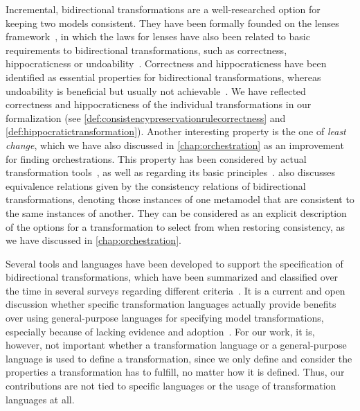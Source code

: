 Incremental, bidirectional transformations are a well-researched option for keeping two models consistent.
They have been formally founded on the lenses framework~\cite{stevens2008bxalgebraic-ICGT}, in which the laws for lenses have also been related to basic requirements to bidirectional transformations, such as correctness, hippocraticness or undoability~\cite{stevens2010sosym}.
Correctness and hippocraticness have been identified as essential properties for bidirectional transformations, whereas undoability is beneficial but usually not achievable~\cite{stevens2010sosym}.
We have reflected correctness and hippocraticness of the individual transformations in our formalization (see \autoref{def:consistencypreservationrulecorrectness} and \autoref{def:hippocratictransformation}).
Another interesting property is the one of \emph{least change}, which we have also discussed in \autoref{chap:orchestration} as an improvement for finding orchestrations.
This property has been considered by actual transformation tools~\cite{macedo2016qvtAtlAlloy-SoSym}, as well as regarding its basic principles~\cite{cheney2017LeastChangeBx-JOT}.
\textcite{stevens2012equivalences-EASST} also discusses equivalence relations given by the consistency relations of bidirectional transformations, denoting those instances of one metamodel that are consistent to the same instances of another.
They can be considered as an explicit description of the options for a transformation to select from when restoring consistency, as we have discussed in \autoref{chap:orchestration}.

Several tools and languages have been developed to support the specification of bidirectional transformations, which have been summarized and classified over the time in several surveys regarding different criteria~\cite{stevens2008LandscapeBidirectionalTransformation-GTTSE, diRuscio2012transformations-SFM, etzlstorfer2013SurveyIncrementalTransformation-ME, jakumeit2014transformationTools-SCP, samimi-dehkordi2015bidirectionalSynchronization-ICCKE, samimi-dehkordi2016iccke,hidaka2016classificationTransformations-SoSym,kahani2019SurveyTransformationTools-SoSym}.
It is a current and open discussion whether specific transformation languages actually provide benefits over using general-purpose languages for specifying model transformations, especially because of lacking evidence and adoption~\cite{burgueno2019futureTransformationLanguages-ICMT}. 
For our work, it is, however, not important whether a transformation language or a general-purpose language is used to define a transformation, since we only define and consider the properties a transformation has to fulfill, no matter how it is defined.
Thus, our contributions are not tied to specific languages or the usage of transformation languages at all.

